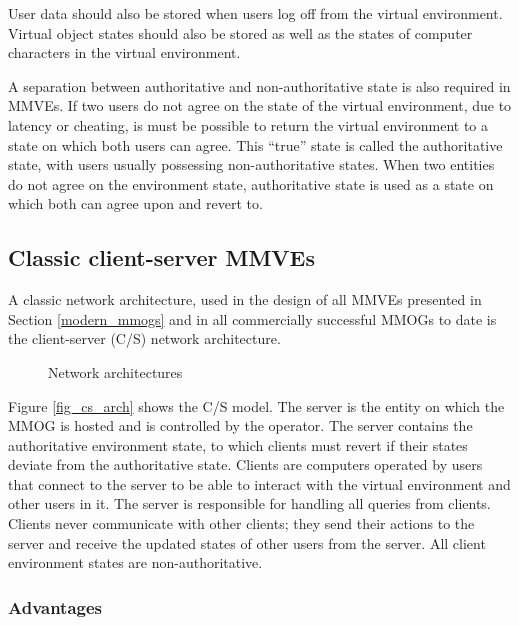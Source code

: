 User data should also be stored when users log off from the virtual environment. Virtual object states should also be stored as well as the states of computer characters in the virtual environment.

A separation between authoritative and non-authoritative state is also required in MMVEs. If two users do not agree on the state of the virtual environment, due to latency or cheating, is must be possible to return the virtual environment to a state on which both users can agree. This ``true'' state is called the authoritative state, with users usually possessing non-authoritative states. When two entities do not agree on the environment state, authoritative state is used as a state on which both can agree upon and revert to.

\subsection{Classic client-server MMVEs}

A classic network architecture, used in the design of all MMVEs presented in Section \ref{modern_mmogs} and in all commercially successful MMOGs to date is the client-server (C/S) network architecture.

\begin{figure}[htbp]
\centering
\caption{Network architectures}
\end{figure}

Figure \ref{fig_cs_arch} shows the C/S model. The server is the entity on which the MMOG is hosted and is controlled by the operator. The server contains the authoritative environment state, to which clients must revert if their states deviate from the authoritative state. Clients are computers operated by users that connect to the server to be able to interact with the virtual environment and other users in it. The server is responsible for handling all queries from clients. Clients never communicate with other clients; they send their actions to the server and receive the updated states of other users from the server. All client environment states are non-authoritative.

\subsubsection{Advantages}

